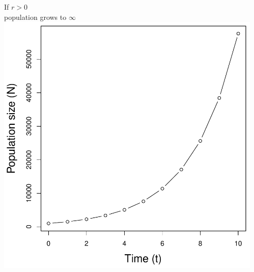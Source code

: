 \documentclass[color=usenames,dvipsnames]{beamer}\usepackage[]{graphicx}\usepackage[]{xcolor}
\begin{document}
\begin{frame}
\begin{columns}
\begin{column}{0.33\textwidth}
    \end{column}
    \begin{column}{0.33\textwidth}
      \small
      \centering
      If $r > 0$ \\ population grows to $\infty$ \\
      \includegraphics[width=\textwidth]{figs/rg0}
    \end{column}
  \end{columns}
\end{frame}







\end{document}
